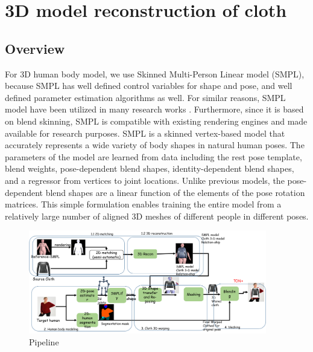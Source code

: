 \section{3D model reconstruction of cloth} \label{section:3dclothrecon}

\subsection{Overview} 

For 3D human body model, we use Skinned Multi-Person Linear model (SMPL)\cite{Loper2015SMPLAS}, because SMPL has well defined control variables for shape and pose, and well defined parameter estimation algorithms as well. For similar reasons, SMPL\cite{Loper2015SMPLAS} model have been utilized in many research works \cite{Zanfir2018HumanAT,Weng2018PhotoW3}. Furthermore, since it is based on blend skinning, SMPL is compatible with existing rendering engines\cite{Loper2015SMPLAS} and made available for research purposes. SMPL is a skinned vertex-based model that accurately represents a wide variety of body shapes in natural human poses. The parameters of the model are learned from data including the rest pose template, blend weights, pose-dependent blend shapes, identity-dependent blend shapes, and a regressor from vertices to joint locations. Unlike previous models, the pose-dependent blend shapes are a linear function of the elements of the pose rotation matrices. This simple formulation enables training the entire model from a relatively large number of aligned 3D meshes of different people in different poses. \cite{Loper2015SMPLAS} 


\begin{figure}[t]
\centering
\includegraphics[height=4.5cm, scale=1]{figures/pipeline.png}   %
\caption{Pipeline}
\label{fig:piepline}
\end{figure}


